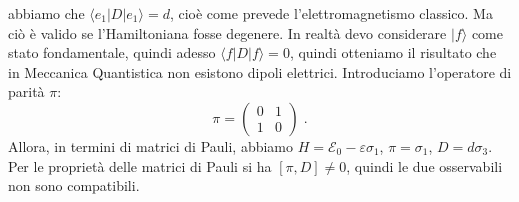 \documentclass[12pt,a4paper]{report}
\theoremstyle{definition}
\numberwithin{equation}{section}
\newcommand{\bra}{\langle}
\newcommand{\ket}{\rangle}
\begin{document}
abbiamo che $\bra e_1|D|e_1\ket=d$, cioè come prevede l'elettromagnetismo classico. Ma ciò è valido se l'Hamiltoniana fosse degenere. In realtà devo considerare $|f\ket$ come stato fondamentale, quindi adesso $\bra f|D|f\ket=0$, quindi otteniamo il risultato che in Meccanica Quantistica non esistono dipoli elettrici. Introduciamo l'operatore di parità $\pi$:
\begin{equation}
\pi=\left(
\begin{matrix}
0 & 1 \\
1 & 0
\end{matrix}\right)\;.
\end{equation}
Allora, in termini di matrici di Pauli, abbiamo $H=\mathcal{E}_0-\varepsilon\sigma_1$, $\pi=\sigma_1$, $D=d\sigma_3$. Per le proprietà delle matrici di Pauli si ha $[\pi,D]\ne 0$, quindi le due osservabili non sono compatibili.
\end{document}
